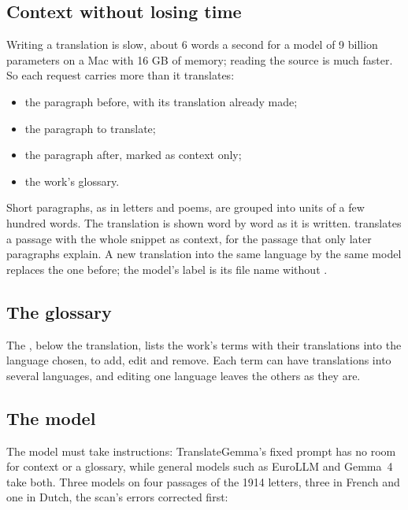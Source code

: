 \subsection{Context without losing time}
Writing a translation is slow, about 6 words a second for a model of 9 billion parameters on a Mac with 16 GB of
memory; reading the source is much faster. So each request carries more than it translates:
\begin{itemize}
  \item the paragraph before, with its translation already made;
  \item the paragraph to translate;
  \item the paragraph after, marked as context only;
  \item the work's glossary.
\end{itemize}
Short paragraphs, as in letters and poems, are grouped into units of a few hundred words. The translation is shown word
by word as it is written.  translates a passage with the whole snippet as context, for the passage
that only later paragraphs explain. A new translation into the same language by the same model replaces the one
before; the model's label is its file name without .

\subsection{The glossary}
The , below the translation, lists the work's terms with their translations into the language chosen,
to add, edit and remove. Each term can have translations into several languages, and editing one language leaves the
others as they are.

\subsection{The model}
The model must take instructions: TranslateGemma's fixed prompt has no room for context or a glossary, while general
models such as EuroLLM and Gemma~4 take both. Three models on four passages of the 1914 letters, three in French and one
in Dutch, the scan's errors corrected first:

